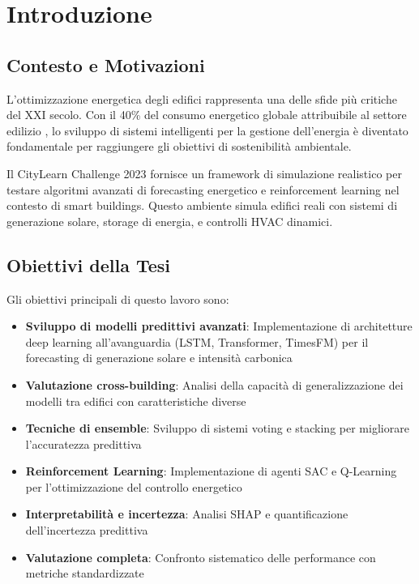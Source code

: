 \documentclass[12pt,a4paper,twoside]{report}
\begin{document}
\chapter{Introduzione}

\section{Contesto e Motivazioni}

L'ottimizzazione energetica degli edifici rappresenta una delle sfide più critiche del XXI secolo. Con il 40\% del consumo energetico globale attribuibile al settore edilizio \cite{iea2019}, lo sviluppo di sistemi intelligenti per la gestione dell'energia è diventato fondamentale per raggiungere gli obiettivi di sostenibilità ambientale.

Il CityLearn Challenge 2023 fornisce un framework di simulazione realistico per testare algoritmi avanzati di forecasting energetico e reinforcement learning nel contesto di smart buildings. Questo ambiente simula edifici reali con sistemi di generazione solare, storage di energia, e controlli HVAC dinamici.

\section{Obiettivi della Tesi}

Gli obiettivi principali di questo lavoro sono:

\begin{itemize}
    \item \textbf{Sviluppo di modelli predittivi avanzati}: Implementazione di architetture deep learning all'avanguardia (LSTM, Transformer, TimesFM) per il forecasting di generazione solare e intensità carbonica
    
    \item \textbf{Valutazione cross-building}: Analisi della capacità di generalizzazione dei modelli tra edifici con caratteristiche diverse
    
    \item \textbf{Tecniche di ensemble}: Sviluppo di sistemi voting e stacking per migliorare l'accuratezza predittiva
    
    \item \textbf{Reinforcement Learning}: Implementazione di agenti SAC e Q-Learning per l'ottimizzazione del controllo energetico
    
    \item \textbf{Interpretabilità e incertezza}: Analisi SHAP e quantificazione dell'incertezza predittiva
    
    \item \textbf{Valutazione completa}: Confronto sistematico delle performance con metriche standardizzate
\end{itemize}
\end{document}
